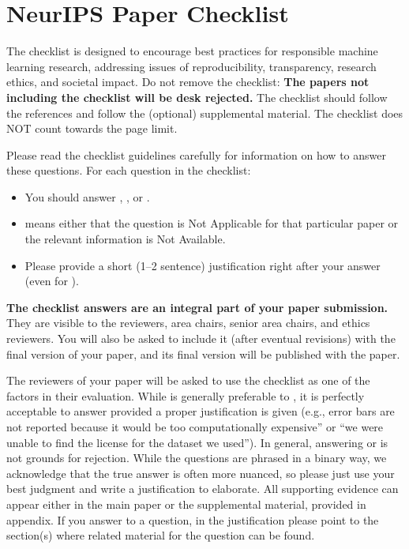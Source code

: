 \section*{NeurIPS Paper Checklist}

The checklist is designed to encourage best practices for responsible machine learning research, addressing issues of reproducibility, transparency, research ethics, and societal impact. Do not remove the checklist: {\bf The papers not including the checklist will be desk rejected.} The checklist should follow the references and follow the (optional) supplemental material.  The checklist does NOT count towards the page
limit. 

Please read the checklist guidelines carefully for information on how to answer these questions. For each question in the checklist:
\begin{itemize}
    \item You should answer \answerYes{}, \answerNo{}, or \answerNA{}.
    \item \answerNA{} means either that the question is Not Applicable for that particular paper or the relevant information is Not Available.
    \item Please provide a short (1--2 sentence) justification right after your answer (even for \answerNA). 
\end{itemize}

{\bf The checklist answers are an integral part of your paper submission.} They are visible to the reviewers, area chairs, senior area chairs, and ethics reviewers. You will also be asked to include it (after eventual revisions) with the final version of your paper, and its final version will be published with the paper.

The reviewers of your paper will be asked to use the checklist as one of the factors in their evaluation. While \answerYes{} is generally preferable to \answerNo{}, it is perfectly acceptable to answer \answerNo{} provided a proper justification is given (e.g., error bars are not reported because it would be too computationally expensive'' or ``we were unable to find the license for the dataset we used''). In general, answering \answerNo{} or \answerNA{} is not grounds for rejection. While the questions are phrased in a binary way, we acknowledge that the true answer is often more nuanced, so please just use your best judgment and write a justification to elaborate. All supporting evidence can appear either in the main paper or the supplemental material, provided in appendix. If you answer \answerYes{} to a question, in the justification please point to the section(s) where related material for the question can be found.

